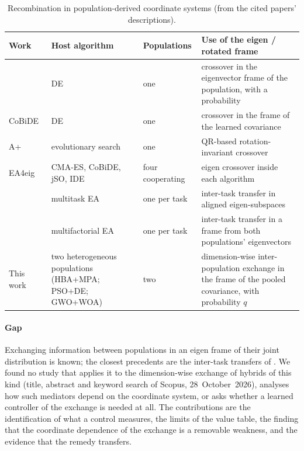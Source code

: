 \begin{table}[!htbp]
\centering
\caption{Recombination in population-derived coordinate systems (from the cited papers' descriptions).}
\label{tab:related}
\footnotesize
\begin{tabular}{p{3.4cm}p{2.8cm}p{2.5cm}p{5.8cm}}
\toprule
Work & Host algorithm & Populations & Use of the eigen / rotated frame \\
\midrule
\citet{guo2015eigen} & DE & one & crossover in the eigenvector frame of the population, with a probability \\
CoBiDE~\citep{wang2014cobide} & DE & one & crossover in the frame of the learned covariance \\
A+~\citep{civicioglu2018aplus} & evolutionary search & one & QR-based rotation-invariant crossover \\
EA4eig~\citep{bujok2022ea4eig} & CMA-ES, CoBiDE, jSO, IDE & four cooperating & eigen crossover inside each algorithm \\
\citet{tang2021regularized} & multitask EA & one per task & inter-task transfer in aligned eigen-subspaces \\
\citet{tang2022adaptive} & multifactorial EA & one per task & inter-task transfer in a frame from both populations' eigenvectors \\
\midrule
This work & two heterogeneous populations (HBA+MPA; PSO+DE; GWO+WOA) & two & dimension-wise inter-population exchange in the frame of the pooled covariance, with probability $q$ \\
\bottomrule
\end{tabular}
\end{table}

\paragraph{Gap} Exchanging information between populations in an eigen frame of their joint distribution is known; the
closest precedents are the inter-task transfers of \citet{tang2021regularized,tang2022adaptive}. We found no study that
applies it to the dimension-wise exchange of hybrids of this kind (title, abstract and keyword search of Scopus,
28~October~2026), analyses how such mediators depend on the coordinate system, or asks whether a learned controller of the
exchange is needed at all. The contributions are the identification of what a control
measures, the limits of the value table, the finding that the coordinate dependence of the exchange is a removable
weakness, and the evidence that the remedy transfers.

